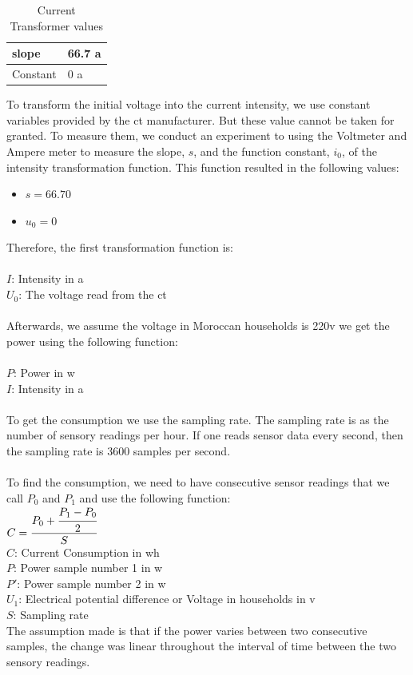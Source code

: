 \documentclass[12pt,a4paper,final]{report}
\begin{document}
\begin{table}
    \begin{tabular}{ll}
    \hline
    slope    & 66.7 \gls{a} \\ \hline
    Constant & 0 \gls{a}    \\ \hline
    \end{tabular}
    \caption{Current Transformer values}
        \label{table:CT_vals}
\end{table}
To transform the initial voltage into the current intensity, we use constant variables provided by the \gls{ct} manufacturer. But these value cannot be taken for granted. To measure them, we conduct an experiment to using the Voltmeter and Ampere meter to measure the slope, $s$, and the function constant, $i_0$, of the intensity transformation function. This function resulted in the following values: 
\begin{itemize}
\item $s = 66.70$
\item $u_0 = 0$
\end{itemize}
Therefore, the first transformation function is: \\
 \\
$I$: Intensity in \gls{a} \\
$U_0$: The voltage read from the \gls{ct}

\paragraph{}
Afterwards, we assume the voltage in Moroccan households is 220\gls{v} we get the power using the following function:
\\
 \\
$P$: Power in \gls{w} \\
$I$: Intensity in \gls{a}
\paragraph{}
To get the consumption we use the sampling rate. The sampling rate is as the number of sensory readings per hour. If one reads sensor data every second, then the sampling rate is 3600 samples per second.
\paragraph{}
To find the consumption, we need to have consecutive sensor readings that we call $P_0$ and $P_1$ and use the following function:
\\
$ C = \cfrac{P_0 + \cfrac{P_1 - P_0}{2}}{S} $ \\
$C$: Current Consumption in \gls{wh} \\
$P$: Power sample number 1 in \gls{w} \\
$P'$: Power sample number 2 in \gls{w} \\
$U_1$: Electrical potential difference or Voltage in households in \gls{v} \\
$S$: Sampling rate \\
The assumption made is that if the power varies between two consecutive samples, the change was linear throughout the interval of time between the two sensory readings.
\end{document}
